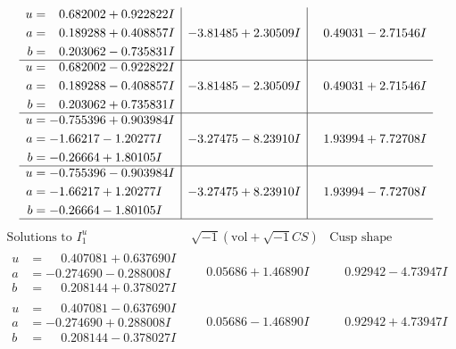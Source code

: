 \documentclass[1p]{elsarticle_modified}
\theoremstyle{definition}
\newcommand{\I}{\sqrt{-1}}
\begin{document}
$$\begin{array}{c|c|c}
\begin{aligned}
u &= \phantom{-}0.682002 + 0.922822 I \\
a &= \phantom{-}0.189288 + 0.408857 I \\
b &= \phantom{-}0.203062 - 0.735831 I\end{aligned}
 & -3.81485 + 2.30509 I & \phantom{-}0.49031 - 2.71546 I \\ \hline\begin{aligned}
u &= \phantom{-}0.682002 - 0.922822 I \\
a &= \phantom{-}0.189288 - 0.408857 I \\
b &= \phantom{-}0.203062 + 0.735831 I\end{aligned}
 & -3.81485 - 2.30509 I & \phantom{-}0.49031 + 2.71546 I \\ \hline\begin{aligned}
u &= -0.755396 + 0.903984 I \\
a &= -1.66217 - 1.20277 I \\
b &= -0.26664 + 1.80105 I\end{aligned}
 & -3.27475 - 8.23910 I & \phantom{-}1.93994 + 7.72708 I \\ \hline\begin{aligned}
u &= -0.755396 - 0.903984 I \\
a &= -1.66217 + 1.20277 I \\
b &= -0.26664 - 1.80105 I\end{aligned}
 & -3.27475 + 8.23910 I & \phantom{-}1.93994 - 7.72708 I\\
 \hline 
 \end{array}$$\newpage$$\begin{array}{c|c|c}  
\text{Solutions to }I^u_{1}& \I (\text{vol} + \sqrt{-1}CS) & \text{Cusp shape}\\
 \hline 
\begin{aligned}
u &= \phantom{-}0.407081 + 0.637690 I \\
a &= -0.274690 - 0.288008 I \\
b &= \phantom{-}0.208144 + 0.378027 I\end{aligned}
 & \phantom{-}0.05686 + 1.46890 I & \phantom{-}0.92942 - 4.73947 I \\ \hline\begin{aligned}
u &= \phantom{-}0.407081 - 0.637690 I \\
a &= -0.274690 + 0.288008 I \\
b &= \phantom{-}0.208144 - 0.378027 I\end{aligned}
 & \phantom{-}0.05686 - 1.46890 I & \phantom{-}0.92942 + 4.73947 I \\ \hline\begin{aligned}

\end{aligned}
\end{array}$$
\end{document}
